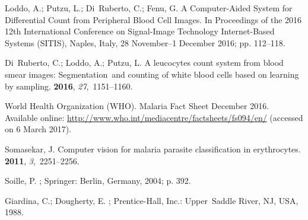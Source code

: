 \documentclass[sensors,review,accept,moreauthors,pdftex,10pt,a4paper]{mdpi}
\begin{document}

\begin{thebibliography}{999}
\providecommand{\natexlab}[1]{#1}

Loddo, A.; Putzu, L.; Di~Ruberto, C.; Fenu, G.
\newblock A Computer-Aided System for Differential Count from Peripheral Blood
  Cell Images.
\newblock  In Proceedings of the 2016 12th International Conference on
  Signal-Image Technology Internet-Based Systems (SITIS),  Naples, Italy, 28 November--1 December 2016; pp. 112--118.

Di~Ruberto, C.; Loddo, A.; Putzu, L.
\newblock A leucocytes count system from blood smear images: Segmentation~and
  counting of white blood cells based on learning by sampling.
 {\bf 2016}, {\em
  27},~1151--1160.

World Health Organization (WHO).
\newblock Malaria Fact Sheet December 2016. Available online: 
\newblock \url{http://www.who.int/mediacentre/factsheets/fs094/en/} 
\newblock (accessed on 6 March 2017).

Somasekar, J.
\newblock Computer vision for malaria parasite classification in erythrocytes.
 {\bf
  2011}, {\em 3},~2251--2256.

Soille, P.
;
  Springer: Berlin, Germany,  2004; p. 392.

Giardina, C.; Dougherty, E.
;
  Prentice-Hall, Inc.: Upper~Saddle River, NJ, USA,  1988.


\end{thebibliography}
\end{document}

